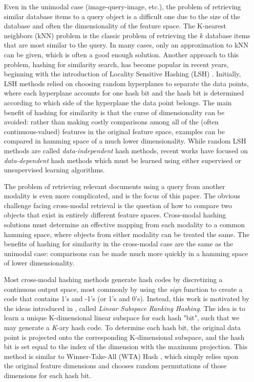 \documentclass[letterpaper]{article}
\begin{document}
Even in the unimodal case (image-query-image, etc.), the problem of retrieving similar database items to a query object is a difficult one due to the size of the database and often the dimensionality of the feature space. The K-nearest neighbors (kNN) problem is the classic problem of retrieving the $ k $ database items that are most similar to the query. In many cases, only an approximation to kNN can be given, which is often a good enough solution. Another approach to this problem, hashing for similarity search, has become popular in recent years, beginning with the introduction of Locality Sensitive Hashing (LSH) \cite{lsh}. Initially, LSH methods relied on choosing random hyperplanes to separate the data points, where each hyperplane accounts for one hash bit and the hash bit is determined according to which side of the hyperplane the data point belongs. The main benefit of hashing for similarity is that the curse of dimensionality can be avoided: rather than making costly comparisons among all of the (often continuous-valued) features in the original feature space, examples can be compared in hamming space of a much lower dimensionality. While random LSH methods are called \emph{data-independent} hash methods, recent works have focused on \emph{data-dependent} hash methods which must be learned using either supervised or unsupervised learning algorithms.

The problem of retrieving relevant documents using a query from another modality is even more complicated, and is the focus of this paper. The obvious challenge facing cross-modal retrieval is the question of how to compare two objects that exist in entirely different feature spaces. Cross-modal hashing solutions must determine an effective mapping from each modality to a common hamming space, where objects from either modality can be treated the same. The benefits of hashing for similarity in the cross-modal case are the same as the unimodal case: comparisons can be made much more quickly in a hamming space of lower dimensionality.

Most cross-modal hashing methods generate hash codes by discretizing a continuous output space, most commonly by using the \emph{sign} function to create a code that contains 1's and -1's (or 1's and 0's). Instead, this work is motivated by the ideas introduced in \cite{kai}, called \emph{Linear Subspace Ranking Hashing}. The idea is to learn a unique K-dimensional linear subspace for each hash "bit", such that we may generate a \emph{K}-ary hash code. To determine each hash bit, the original data point is projected onto the corresponding K-dimensional subspace, and the hash bit is set equal to the index of the dimension with the maximum projection. This method is similar to Winner-Take-All (WTA) Hash \cite{wta}, which simply relies upon the original feature dimensions and chooses random permutations of those dimensions for each hash bit.
\end{document}
